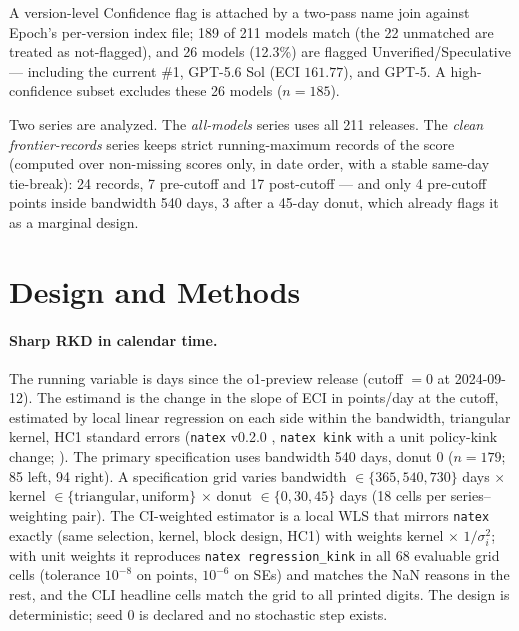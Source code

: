 \documentclass[11pt]{article}
\newcommand{\natex}{\texttt{natex}}
\begin{document}
A version-level Confidence flag is attached by a two-pass name join against
Epoch's per-version index file; 189 of 211 models match (the 22 unmatched are
treated as not-flagged), and 26 models (12.3\%) are flagged
Unverified/Speculative --- including the current \#1, GPT-5.6 Sol (ECI
$161.77$), and GPT-5. A high-confidence subset excludes these 26 models
($n=185$).

Two series are analyzed. The \emph{all-models} series uses all 211 releases.
The \emph{clean frontier-records} series keeps strict running-maximum records
of the score (computed over non-missing scores only, in date order, with a
stable same-day tie-break): 24 records, 7 pre-cutoff and 17 post-cutoff ---
and only 4 pre-cutoff points inside bandwidth 540 days, 3 after a 45-day
donut, which already flags it as a marginal design.

\section{Design and Methods}\label{sec:methods}

\paragraph{Sharp RKD in calendar time.} The running variable is days since
the o1-preview release (cutoff $= 0$ at 2024-09-12). The estimand is the
change in the slope of ECI in points/day at the cutoff, estimated by local
linear regression on each side within the bandwidth, triangular kernel, HC1
standard errors (\natex{} v0.2.0 \cite{natex}, \texttt{natex kink} with a
unit policy-kink change; \cite{card2015,bockerman2025}). The primary
specification uses bandwidth 540 days, donut 0 ($n=179$; 85 left, 94 right).
A specification grid varies bandwidth $\in\{365,540,730\}$ days $\times$
kernel $\in\{\text{triangular},\text{uniform}\}$ $\times$ donut
$\in\{0,30,45\}$ days
(18 cells per series--weighting pair). The CI-weighted estimator is a local
WLS that mirrors \natex{} exactly (same selection, kernel, block design, HC1)
with weights kernel$\,\times\,1/\sigma_i^2$; with unit weights it reproduces
\texttt{natex regression\_kink} in all 68 evaluable grid cells (tolerance
$10^{-8}$ on points, $10^{-6}$ on SEs) and matches the NaN reasons in the
rest, and the CLI headline cells match the grid to all printed digits. The
design is deterministic; seed 0 is declared and no stochastic step exists.
\end{document}
